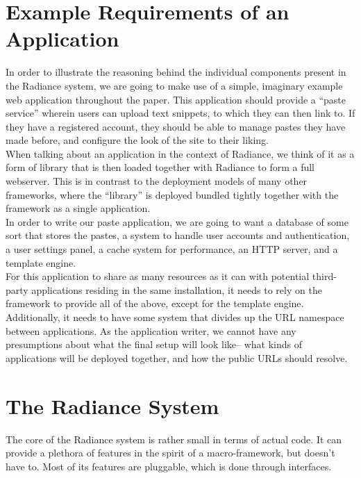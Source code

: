 \documentclass{sig-alternate}
\begin{document}
\section{Example Requirements of an Application}
In order to illustrate the reasoning behind the individual components present in the Radiance system, we are going to make use of a simple, imaginary example web application throughout the paper. This application should provide a ``paste service'' wherein users can upload text snippets, to which they can then link to. If they have a registered account, they should be able to manage pastes they have made before, and configure the look of the site to their liking. \\

When talking about an application in the context of Radiance, we think of it as a form of library that is then loaded together with Radiance to form a full webserver. This is in contrast to the deployment models of many other frameworks, where the ``library'' is deployed bundled tightly together with the framework as a single application. \\

In order to write our paste application, we are going to want a database of some sort that stores the pastes, a system to handle user accounts and authentication, a user settings panel, a cache system for performance, an HTTP server, and a template engine. \\

For this application to share as many resources as it can with potential third-party applications residing in the same installation, it needs to rely on the framework to provide all of the above, except for the template engine. Additionally, it needs to have some system that divides up the URL namespace between applications. As the application writer, we cannot have any presumptions about what the final setup will look like-- what kinds of applications will be deployed together, and how the public URLs should resolve.

\section{The Radiance System}
The core of the Radiance system is rather small in terms of actual code. It can provide a plethora of features in the spirit of a macro-framework, but doesn't have to. Most of its features are pluggable, which is done through interfaces. \\
\end{document}
